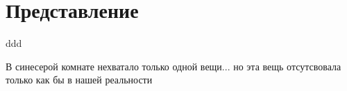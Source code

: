 \newpage
\section{Представление}
{\centering
	ddd\par
}
В синесерой комнате нехватало только одной вещи... 
но эта вещь отсутсвовала только как бы в нашей реальности
